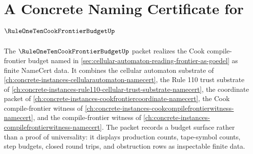 \chapter{A Concrete Naming Certificate for $\RuleOneTenCookFrontierBudgetUp$}
\label{ch:concrete-instances-rule110-cook-frontier-budget-namecert}

The $\RuleOneTenCookFrontierBudgetUp$ packet realizes the Cook compile-frontier budget named in \autoref{sec:cellular-automaton-reading-frontier-as-goedel} as finite NameCert data. It combines the cellular automaton substrate of \autoref{ch:concrete-instances-cellularautomaton-namecert}, the Rule 110 trust substrate of \autoref{ch:concrete-instances-rule110-cellular-trust-substrate-namecert}, the coordinate packet of \autoref{ch:concrete-instances-cookfrontiercoordinate-namecert}, the Cook compile-frontier witness of \autoref{ch:concrete-instances-cookcompilefrontierwitness-namecert}, and the compile-frontier witness of \autoref{ch:concrete-instances-compilefrontierwitness-namecert}. The packet records a budget surface rather than a proof of universality: it displays production counts, tape-symbol counts, step budgets, closed round trips, and obstruction rows as inspectable finite data.

